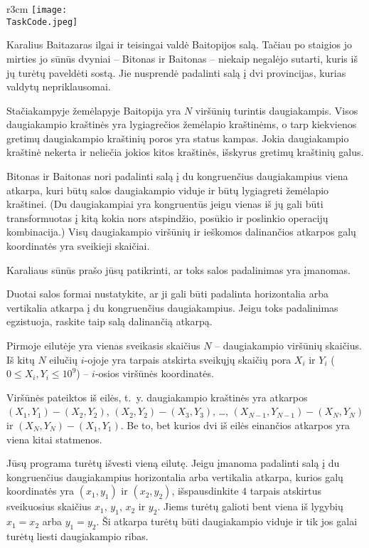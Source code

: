 \documentclass{boi2014-lt}
\renewcommand{\TaskCode}{demarcation}
\begin{document}
    \begin{wrapfigure}{r}{3cm}
        \vspace{-24pt}
        \texttt{[image: \\TaskCode.jpeg]}
    \end{wrapfigure}

    Karalius Baitazaras ilgai ir teisingai valdė Baitopijos salą. Tačiau po
    staigios jo mirties jo sūnūs dvyniai -- Bitonas ir Baitonas -- niekaip
    negalėjo sutarti, kuris iš jų turėtų paveldėti sostą. Jie nusprendė
    padalinti salą į dvi provincijas, kurias valdytų nepriklausomai.
 
    Stačiakampyje žemėlapyje Baitopija yra $N$ viršūnių turintis daugiakampis.
    Visos daugiakampio kraštinės yra lygiagrečios žemėlapio kraštinėms, o
    tarp kiekvienos gretimų daugiakampio kraštinių poros yra status kampas. Jokia
    daugiakampio kraštinė nekerta ir neliečia jokios kitos kraštinės, išskyrus
    gretimų kraštinių galus.

    Bitonas ir Baitonas nori padalinti salą į du kongruenčius daugiakampius
    viena atkarpa, kuri būtų salos daugiakampio viduje ir būtų lygiagreti
    žemėlapio kraštinei. (Du daugiakampiai yra kongruentūs jeigu vienas iš jų
    gali būti transformuotas į kitą kokia nors atspindžio, posūkio ir poslinkio
    operacijų kombinacija.) Visų daugiakampio viršūnių ir ieškomos dalinančios
    atkarpos galų koordinatės yra sveikieji skaičiai.
 
    Karaliaus sūnūs prašo jūsų patikrinti, ar toks salos padalinimas yra
    įmanomas.

    \Task
    Duotai salos formai nustatykite, ar ji gali būti padalinta horizontalia arba
    vertikalia atkarpa į du kongruenčius daugiakampius. Jeigu toks padalinimas
    egzistuoja, raskite taip salą dalinančią atkarpą.

    \Input
    Pirmoje eilutėje yra vienas sveikasis skaičius $N$ -- daugiakampio viršūnių
    skaičius. Iš kitų $N$ eilučių $i$-ojoje yra tarpais atskirta sveikųjų
    skaičių pora $X_i$ ir $Y_i$ ($0 \le X_i, Y_i \le 10^9$) -- $i$-osios
    viršūnės koordinatės.
    
    Viršūnės pateiktos iš eilės, t.~y. daugiakampio kraštinės yra atkarpos $(X_1,Y_1) - (X_2,Y_2)$,
    $(X_2,Y_2) - (X_3,Y_3)$, \ldots, $(X_{N-1},Y_{N-1}) - (X_N,Y_N)$ ir
    $(X_N,Y_N) - (X_1,Y_1)$. Be to, bet kurios
    dvi iš eilės einančios atkarpos yra viena kitai statmenos.

    \Output
    Jūsų programa turėtų išvesti vieną eilutę. Jeigu įmanoma padalinti salą į du
    kongruenčius daugiakampius horizontalia arba vertikalia atkarpa, kurios galų
    koordinatės yra $(x_1, y_1)$ ir $(x_2, y_2)$, išspausdinkite $4$ tarpais
    atskirtus sveikuosius skaičius $x_1$, $y_1$, $x_2$ ir $y_2$. Jiems turėtų
    galioti bent viena iš lygybių $x_1 = x_2$ arba $y_1 = y_2$. Ši atkarpa
    turėtų būti daugiakampio viduje ir tik jos galai turėtų liesti daugiakampio
    ribas.
\end{document}
